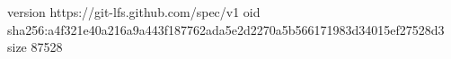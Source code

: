 version https://git-lfs.github.com/spec/v1
oid sha256:a4f321e40a216a9a443f187762ada5e2d2270a5b566171983d34015ef27528d3
size 87528
